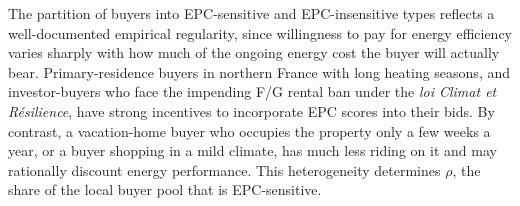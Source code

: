 The partition of buyers into EPC-sensitive and EPC-insensitive types reflects a well-documented empirical regularity, since willingness to pay for energy efficiency varies sharply with how much of the ongoing energy cost the buyer will actually bear. Primary-residence buyers in northern France with long heating seasons, and investor-buyers who face the impending F/G rental ban under the \textit{loi Climat et R\'{e}silience}, have strong incentives to incorporate EPC scores into their bids. By contrast, a vacation-home buyer who occupies the property only a few weeks a year, or a buyer shopping in a mild climate, has much less riding on it and may rationally discount energy performance. This heterogeneity determines $\rho$, the share of the local buyer pool that is EPC-sensitive.
